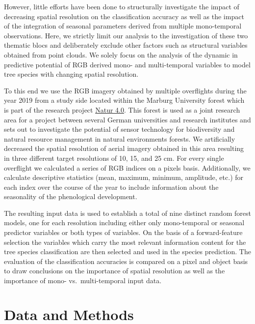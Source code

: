 \documentclass[]{article}
\begin{document}
However, little efforts have been done to structurally investigate the
impact of decreasing spatial resolution on the classification accuracy
as well as the impact of the integration of seasonal parameters derived
from multiple mono-temporal observations. Here, we strictly limit our
analysis to the investigation of these two thematic blocs and
deliberately exclude other factors such as structural variables obtained
from point clouds. We solely focus on the analysis of the dynamic in
predictive potential of RGB derived mono- and multi-temporal variables
to model tree species with changing spatial resolution.

To this end we use the RGB imagery obtained by multiple overflights
during the year 2019 from a study side located within the Marburg
University forest which is part of the research project
\href{https://www.uni-marburg.de/en/fb19/natur40/}{Natur 4.0}. This
forest is used as a joint research area for a project between several
German universities and research institutes and sets out to investigate
the potential of sensor technology for biodiversity and natural resource
management in natural environments forests. We artificially decreased
the spatial resolution of aerial imagery obtained in this area resulting
in three different target resolutions of 10, 15, and 25 cm. For every
single overflight we calculated a series of RGB indices on a pixels
basis. Additionally, we calculate descriptive statistics (mean, maximum,
minimum, amplitude, etc.) for each index over the course of the year to
include information about the seasonality of the phenological
development.

The resulting input data is used to establish a total of nine distinct
random forest models, one for each resolution including either only
mono-temporal or seasonal predictor variables or both types of
variables. On the basis of a forward-feature selection the variables
which carry the most relevant information content for the tree species
classification are then selected and used in the species prediction. The
evaluation of the classification accuracies is compared on a pixel and
object basis to draw conclusions on the importance of spatial resolution
as well as the importance of mono- vs.~multi-temporal input data.

\hypertarget{data-and-methods}{%
\section{Data and Methods}\label{data-and-methods}}
\end{document}

